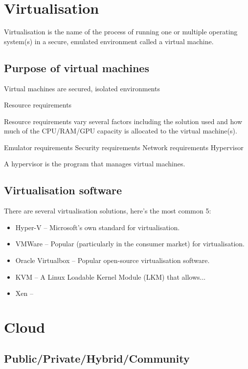 \documentclass{article}
\begin{document}
\section{Virtualisation}

Virtualisation is the name of the process of running one or multiple operating system(s) in a secure, emulated environment called a virtual machine.

\subsection{Purpose of virtual machines}

Virtual machines are secured, isolated environments

Resource requirements

Resource requirements vary several factors including the solution used and how much of the CPU/RAM/GPU capacity is allocated to the virtual machine(s).

Emulator requirements
Security requirements
Network requirements
Hypervisor

A hypervisor is the program that manages virtual machines.

\subsection{Virtualisation software}

There are several virtualisation solutions, here's the most common 5:

\begin{itemize}
    \item Hyper-V -- Microsoft's own standard for virtualisation.
    \item VMWare -- Popular (particularly in the consumer market) for virtualisation.
    \item Oracle Virtualbox -- Popular open-source virtualisation software.
    \item KVM -- A Linux Loadable Kernel Module (LKM) that allows...
    \item Xen -- 
\end{itemize}

\section{Cloud}

\subsection{Public/Private/Hybrid/Community}
\end{document}
